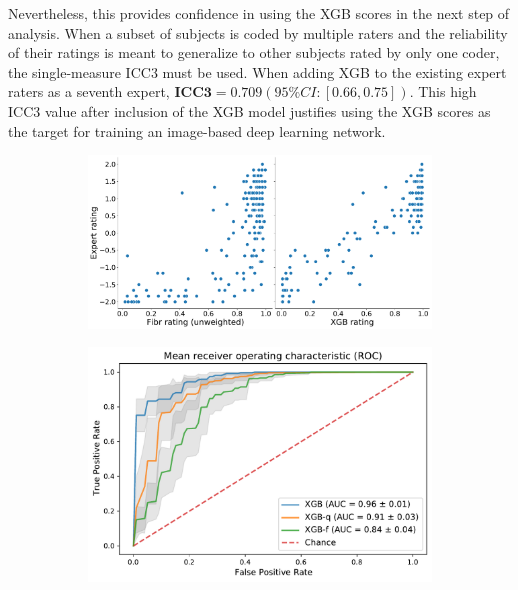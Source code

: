 \documentclass[fleqn,10pt]{wlscirep}
\begin{document}
Nevertheless, this provides confidence in using the XGB scores in the next step
of analysis. When a subset of subjects is coded by multiple raters and the
reliability of their ratings is meant to generalize to other subjects rated by
only one coder, the single-measure ICC3 must be used. When adding XGB to the
existing expert raters as a seventh expert, $\textbf{ICC3} = 0.709 (95\% CI:
[0.66, 0.75])$. This high ICC3 value after inclusion of the XGB model justifies
using the XGB scores as the target for training an image-based deep learning
network.


\begin{figure}[tbp]
    \begin{subfigure}{.55\textwidth}
    \centering
    \includegraphics[width=\linewidth]{community-qc/fibr-rating-scatter-plot.pdf}
    \caption{}
    \label{fig:fibr-qc:scatter}
    \end{subfigure}
    \begin{subfigure}{.45\textwidth}
    \centering
    \includegraphics[width=\linewidth]{community-qc/xgb-roc-curve.pdf}

\end{subfigure}
\end{figure}
\end{document}
